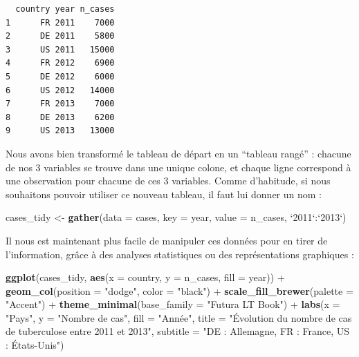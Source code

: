 \documentclass[a4paperpaper,]{article}
\newenvironment{Shaded}{\begin{snugshade}}{\end{snugshade}}
\newcommand{\DataTypeTok}[1]{\textcolor[rgb]{0.00,0.34,0.68}{#1}}
\newcommand{\KeywordTok}[1]{\textcolor[rgb]{0.12,0.11,0.11}{\textbf{#1}}}
\newcommand{\NormalTok}[1]{\textcolor[rgb]{0.12,0.11,0.11}{#1}}
\newcommand{\OperatorTok}[1]{\textcolor[rgb]{0.12,0.11,0.11}{#1}}
\newcommand{\StringTok}[1]{\textcolor[rgb]{0.75,0.01,0.01}{#1}}
\theoremstyle{definition}
\theoremstyle{definition}
\theoremstyle{definition}
\theoremstyle{remark}
\begin{document}
\begin{verbatim}
  country year n_cases
1      FR 2011    7000
2      DE 2011    5800
3      US 2011   15000
4      FR 2012    6900
5      DE 2012    6000
6      US 2012   14000
7      FR 2013    7000
8      DE 2013    6200
9      US 2013   13000
\end{verbatim}

Nous avons bien transformé le tableau de départ en un ``tableau rangé''
: chacune de nos 3 variables se trouve dans une unique colone, et chaque
ligne correspond à une observation pour chacune de ces 3 variables.
Comme d'habitude, si nous souhaitons pouvoir utiliser ce nouveau
tableau, il faut lui donner un nom :

\begin{Shaded}
\begin{Highlighting}[]
\NormalTok{cases_tidy <-}\StringTok{ }\KeywordTok{gather}\NormalTok{(}\DataTypeTok{data =}\NormalTok{ cases, }\DataTypeTok{key =}\NormalTok{ year, }\DataTypeTok{value =}\NormalTok{ n_cases, }\StringTok{`}\DataTypeTok{2011}\StringTok{`}\OperatorTok{:}\StringTok{`}\DataTypeTok{2013}\StringTok{`}\NormalTok{)}
\end{Highlighting}
\end{Shaded}

Il nous est maintenant plus facile de manipuler ces données pour en
tirer de l'information, grâce à des analyses statistiques ou des
représentations graphiques :

\begin{Shaded}
\begin{Highlighting}[]
\KeywordTok{ggplot}\NormalTok{(cases_tidy, }\KeywordTok{aes}\NormalTok{(}\DataTypeTok{x =}\NormalTok{ country, }\DataTypeTok{y =}\NormalTok{ n_cases, }\DataTypeTok{fill =}\NormalTok{ year)) }\OperatorTok{+}
\StringTok{  }\KeywordTok{geom_col}\NormalTok{(}\DataTypeTok{position =} \StringTok{"dodge"}\NormalTok{, }\DataTypeTok{color =} \StringTok{"black"}\NormalTok{) }\OperatorTok{+}
\StringTok{  }\KeywordTok{scale_fill_brewer}\NormalTok{(}\DataTypeTok{palette =} \StringTok{"Accent"}\NormalTok{) }\OperatorTok{+}
\StringTok{  }\KeywordTok{theme_minimal}\NormalTok{(}\DataTypeTok{base_family =} \StringTok{"Futura LT Book"}\NormalTok{) }\OperatorTok{+}
\StringTok{  }\KeywordTok{labs}\NormalTok{(}\DataTypeTok{x =} \StringTok{"Pays"}\NormalTok{,}
       \DataTypeTok{y =} \StringTok{"Nombre de cas"}\NormalTok{,}
       \DataTypeTok{fill =} \StringTok{"Année"}\NormalTok{,}
       \DataTypeTok{title =} \StringTok{"Évolution du nombre de cas de tuberculose entre 2011 et 2013"}\NormalTok{,}
       \DataTypeTok{subtitle =} \StringTok{"DE : Allemagne, FR : France, US : États-Unis"}\NormalTok{)}
\end{Highlighting}
\end{Shaded}
\end{document}
